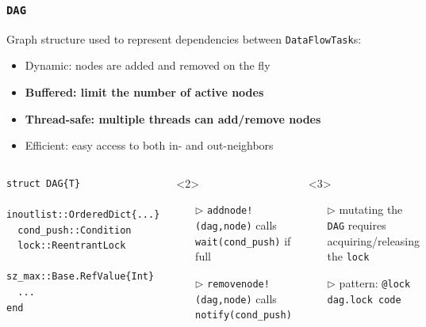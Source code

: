 \documentclass{beamer}
\begin{document}
\begin{frame}[fragile]
\frametitle{{\texttt{DAG}}}  

Graph structure used to represent dependencies between \texttt{DataFlowTask}s:

\begin{itemize}
  \item Dynamic: nodes are added and removed on the fly
  \item \textbf<2>{Buffered: limit the number of active nodes}
  \item \textbf<3>{Thread-safe: multiple threads can add/remove nodes}
  \item Efficient: easy access to both in- and out-neighbors
\end{itemize}

\hrulefill

\begin{columns}

\begin{exampleblock}{}
\begin{verbatim}
struct DAG{T}
  inoutlist::OrderedDict{...}
  cond_push::Condition
  lock::ReentrantLock
  sz_max::Base.RefValue{Int}
  ...
end
\end{verbatim}
\end{exampleblock}


\begin{onlyenv}<2>
\begin{itemize}
  \item[$\triangleright$] \texttt{addnode!(dag,node)} calls
  \texttt{wait(cond_push)} if full
  \item[$\triangleright$] \texttt{removenode!(dag,node)} calls \texttt{notify(cond_push)}
\end{itemize}
\end{onlyenv}

\begin{onlyenv}<3>
  \begin{itemize}
    \item[$\triangleright$] mutating the \texttt{DAG} requires acquiring/releasing the \texttt{lock}
    \item[$\triangleright$] pattern: \texttt{@lock dag.lock code}
  \end{itemize}
  \end{onlyenv}


\end{columns}

\end{frame}
\end{document}
